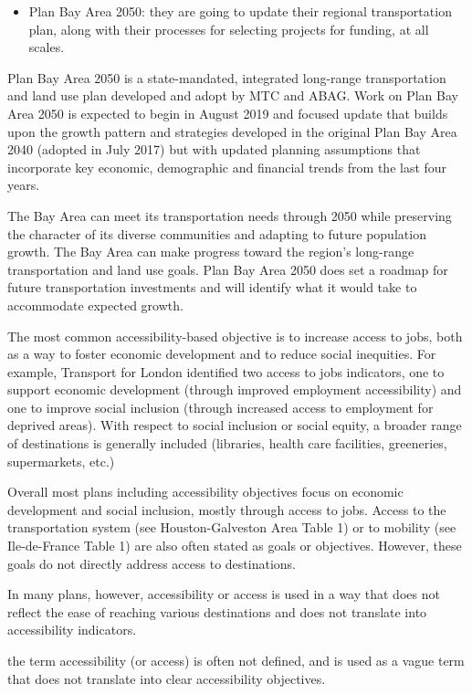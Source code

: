 \documentclass[12pt,]{article}
\providecommand{\tightlist}{%
  \setlength{\itemsep}{0pt}\setlength{\parskip}{0pt}}
\begin{document}
\begin{itemize}
\tightlist
\item
  Plan Bay Area 2050: they are going to update their regional
  transportation plan, along with their processes for selecting projects
  for funding, at all scales.
\end{itemize}

Plan Bay Area 2050 is a state-mandated, integrated long-range
transportation and land use plan developed and adopt by MTC and ABAG.
Work on Plan Bay Area 2050 is expected to begin in August 2019 and
focused update that builds upon the growth pattern and strategies
developed in the original Plan Bay Area 2040 (adopted in July 2017) but
with updated planning assumptions that incorporate key economic,
demographic and financial trends from the last four years.

The Bay Area can meet its transportation needs through 2050 while
preserving the character of its diverse communities and adapting to
future population growth. The Bay Area can make progress toward the
region's long-range transportation and land use goals. Plan Bay Area
2050 does set a roadmap for future transportation investments and will
identify what it would take to accommodate expected growth.

The most common accessibility-based objective is to increase access to
jobs, both as a way to foster economic development and to reduce social
inequities. For example, Transport for London identified two access to
jobs indicators, one to support economic development (through improved
employment accessibility) and one to improve social inclusion (through
increased access to employment for deprived areas). With respect to
social inclusion or social equity, a broader range of destinations is
generally included (libraries, health care facilities, greeneries,
supermarkets, etc.)

Overall most plans including accessibility objectives focus on economic
development and social inclusion, mostly through access to jobs. Access
to the transportation system (see Houston-Galveston Area Table 1) or to
mobility (see Ile-de-France Table 1) are also often stated as goals or
objectives. However, these goals do not directly address access to
destinations.

In many plans, however, accessibility or access is used in a way that
does not reflect the ease of reaching various destinations and does not
translate into accessibility indicators.

the term accessibility (or access) is often not defined, and is used as
a vague term that does not translate into clear accessibility
objectives.
\end{document}
